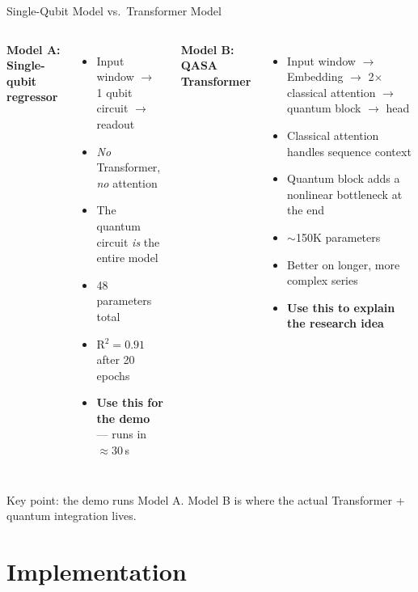 \documentclass[aspectratio=169,professionalfonts]{beamer}
\begin{document}
\begin{frame}{Single-Qubit Model vs.\ Transformer Model}
\begin{columns}[T]
\textbf{Model A: Single-qubit regressor}
\begin{itemize}
  \item Input window $\to$ 1 qubit circuit $\to$ readout
  \item \emph{No} Transformer, \emph{no} attention
  \item The quantum circuit \emph{is} the entire model
  \item 48 parameters total
  \item R$^2 = 0.91$ after 20 epochs
  \item \textbf{Use this for the demo} --- runs in $\approx$30\,s
\end{itemize}

\textbf{Model B: QASA Transformer}
\begin{itemize}
  \item Input window $\to$ Embedding $\to$ 2$\times$ classical attention $\to$ quantum block $\to$ head
  \item Classical attention handles sequence context
  \item Quantum block adds a nonlinear bottleneck at the end
  \item $\sim$150K parameters
  \item Better on longer, more complex series
  \item \textbf{Use this to explain the research idea}
\end{itemize}
\end{columns}

\vspace{0.5em}
\alert{Key point:} the demo runs Model A. Model B is where the actual Transformer + quantum integration lives.
\end{frame}

\section{Implementation}
\end{document}
